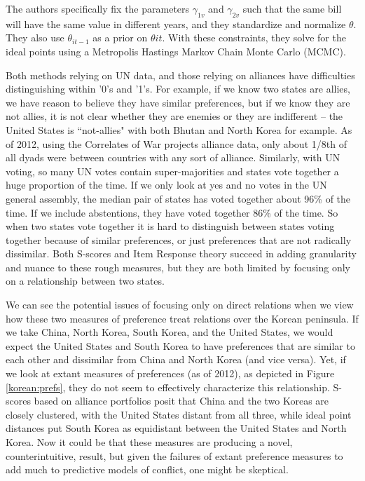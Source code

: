 The authors specifically fix the parameters $\gamma_{1v}$ and $\gamma_{2v}$ such that the same bill will have the same value in different years, and they standardize and normalize $\theta$. They also use $\theta_{it-1}$ as a prior on $\theta{it}$. With these constraints, they solve for the ideal points using a Metropolis Hastings Markov Chain Monte Carlo (MCMC).

Both methods relying on UN data, and those relying on alliances have difficulties distinguishing within '0's and '1's. For example, if we know two states are allies, we have reason to believe they have similar preferences, but if we know they are not allies, it is not clear whether they are enemies or they are indifferent -- the United States is ``not-allies" with both Bhutan and North Korea for example. As of 2012, using the Correlates of War projects alliance data, only about 1/8th of all dyads were between countries with any sort of alliance. Similarly, with UN voting, so many UN votes contain super-majorities and states vote together a huge proportion of the time. If we only look at yes and no votes in the UN general assembly, the median pair of states has voted together about 96\% of the time. If we include abstentions,  they have voted together 86\% of the time. So when two states vote together it is hard to distinguish between states voting together because of similar preferences, or just preferences that are not radically dissimilar. Both S-scores and Item Response theory succeed in adding granularity and nuance to these rough measures, but they are both limited by focusing only on a relationship between two states. 

We can see the potential issues of focusing only on direct relations when we view how these two measures of preference treat relations over the Korean peninsula. If we take China, North Korea, South Korea, and the United States, we would expect the United States and South Korea to have preferences that are similar to each other and dissimilar from China and North Korea (and vice versa). Yet, if we look at extant measures of preferences (as of 2012), as depicted in Figure \ref{korean:prefs}, they do not seem to effectively characterize this relationship. S-scores based on alliance portfolios posit that China and the two Koreas are closely clustered, with the United States distant from all three, while ideal point distances put South Korea as equidistant between the United States and North Korea. Now it could be that these measures are producing a novel, counterintuitive, result, but given the failures of extant preference measures to add much to predictive models of conflict, one might be skeptical.

